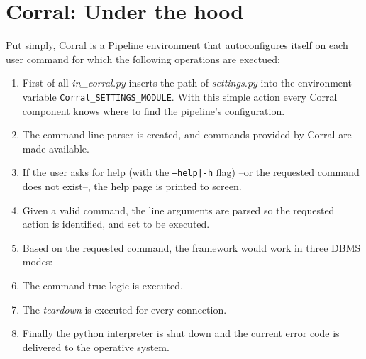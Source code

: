 \documentclass[final,5p,times,twocolumn,authoryear]{elsarticle}
\begin{document}
\section{Corral: Under the hood}
\label{section:under_hood}
%
Put simply, Corral is a Pipeline environment that autoconfigures itself on each user command for which the following operations are exectued:
%
\begin{enumerate}
    \item First of all \textit{in\_corral.py} inserts the path of \textit{settings.py}
    into the  environment variable \texttt{Corral\_SETTINGS\_MODULE}.
    With this simple action every Corral component knows where to find
    the pipeline's configuration.
    \item The command line parser is created, and commands
    provided by Corral are made available.
    \item If the user asks for help (with the \texttt{--help|-h} flag)
    --or the requested command does not exist--, the help page is printed to screen.
    \item Given a valid command, the line arguments are parsed so the requested action
    is identified, and set to be executed.
    \item Based on the requested command, the framework would work in three DBMS modes:
     \item The command true logic is executed.
     \item The \textit{teardown} is executed for every connection.
     \item Finally the python interpreter is shut down
     and the current error code is delivered to the operative system.
\end{enumerate}
\end{document}
